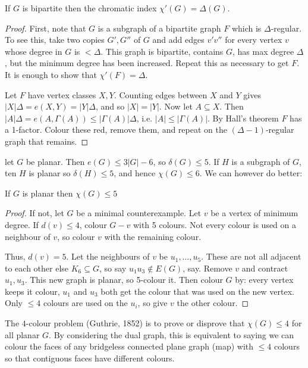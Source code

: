\documentclass[10pt,a4paper]{article}
\begin{document}
\begin{theorem}
If $G$ is bipartite then the chromatic index $\chi'(G) = \Delta(G)$.
\end{theorem}
\begin{proof}
First, note that $G$ is a subgraph of a bipartite graph $F$ which is $\Delta$-regular. To see this, take two copies $G', G''$ of $G$ and add edges $v'v''$ for every vertex $v$ whose degree in $G$ is $<\Delta$. This graph is bipartite, contains $G$, has max degree $\Delta$, but the minimum degree has been increased. Repeat this as necessary to get $F$. It is enough to show that $\chi'(F) = \Delta$.

Let $F$ have vertex classes $X, Y$. Counting edges between $X$ and $Y$ gives $|X|\Delta = e(X,Y) = |Y|\Delta$, and so $|X|=|Y|$. Now let $A \subseteq X$. Then $|A|\Delta = e(A, \Gamma(A)) \leq |\Gamma(A)|\Delta$, i.e. $|A| \leq |\Gamma(A)|$. By Hall's theorem $F$ has a 1-factor. Colour these red, remove them, and repeat on the $(\Delta-1)$-regular graph that remains.
\end{proof}
let $G$ be planar. Then $e(G) \leq 3|G|-6$, so $\delta(G) \leq 5$. If $H$ is a subgraph of $G$, ten $H$ is planar so $\delta(H) \leq 5$, and hence $\chi(G) \leq 6$. We can however do better:
\begin{theorem}[Heawood 1890]
If $G$ is planar then $\chi(G) \leq 5$
\end{theorem}
\begin{proof}
If not, let $G$ be a minimal counterexample. Let $v$ be a vertex of minimum degree. If $d(v) \leq 4$, colour $G-v$ with 5 colours. Not every colour is used on a neighbour of $v$, so colour $v$ with the remaining colour.

Thus, $d(v) = 5$. Let the neighbours of $v$ be $u_1, \ldots, u_5$. These are not all adjacent to each other else $K_6 \subseteq G$, so say $u_1u_3 \notin E(G)$, say. Remove $v$ and contract $u_1, u_3$. This new graph is planar, so 5-colour it. Then colour $G$ by: every vertex keeps it colour, $u_1$ and $u_3$ both get the colour that was used on the new vertex. Only $\leq 4$ colours are used on the $u_i$, so give $v$ the other colour.
\end{proof}

The $4$-colour problem (Guthrie, 1852) is to prove or disprove that $\chi(G) \leq 4$ for all planar $G$. By considering the dual graph, this is equivalent to saying we can colour the faces of any bridgeless connected plane graph (map) with $\leq 4$ colours so that contiguous faces have different colours. 
\end{document}
